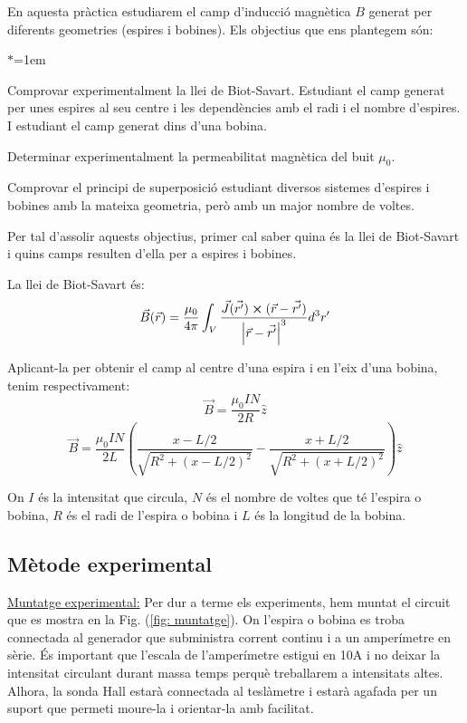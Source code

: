 \documentclass[11pt]{article}
\numberwithin{equation}{section}
\numberwithin{figure}{section}
\numberwithin{table}{section}
\begin{document}
En aquesta pràctica estudiarem el camp d'inducció magnètica $B$ generat per diferents geometries (espires i bobines). Els objectius que ens plantegem són:

\begin{list}{$\ast$}{\leftmargin=1em}
    \item Comprovar experimentalment la llei de Biot-Savart. Estudiant el camp generat per unes espires al seu centre i les dependències amb el radi i el nombre d'espires. I estudiant el camp generat dins d'una bobina.
    \item Determinar experimentalment la permeabilitat magnètica del buit $\mu_0$.
    \item Comprovar el principi de superposició estudiant diversos sistemes d'espires i bobines amb la mateixa geometria, però amb un major nombre de voltes.
\end{list}

Per tal d'assolir aquests objectius, primer cal saber quina és la llei de Biot-Savart i quins camps resulten d'ella per a espires i bobines.

La llei de Biot-Savart és:
\begin{equation} \label{eq: Biot-Savart}
    \vec{B}(\vec{r}) = \frac{\mu_0}{4\pi}\int_V\frac{\vec{J}(\vec{r'}) \cross (\vec{r}-\vec{r'})}{\abs{\vec{r}-\vec{r'}}^3}d^3r'
\end{equation}

Aplicant-la per obtenir el camp al centre d'una espira i en l'eix d'una bobina, tenim respectivament:
\begin{equation} \label{eq: B_espira}
    \vec{B} = \frac{\mu_0IN}{2R}\hat{z}
\end{equation}
\begin{equation} \label{eq: B_bobina}
    \vec{B} = \frac{\mu_0IN}{2L}\left(\frac{x-L/2}{\sqrt{R^2+(x-L/2)^2}}-\frac{x+L/2}{\sqrt{R^2+(x+L/2)^2}}  \right) \hat{z}
\end{equation}

On $I$ és la intensitat que circula, $N$ és el nombre de voltes que té l'espira o bobina, $R$ és el radi de l'espira o bobina i $L$ és la longitud de la bobina.

\subsection{Mètode experimental}\label{sec: mètode}

\underline{Muntatge experimental:}
Per dur a terme els experiments, hem muntat el circuit que es mostra en la Fig. (\ref{fig: muntatge}). On l'espira o bobina es troba connectada al generador que subministra corrent continu i a un amperímetre en sèrie. És important que l'escala de l'amperímetre estigui en 10A i no deixar la intensitat circulant durant massa temps perquè treballarem a intensitats altes. Alhora, la sonda Hall estarà connectada al teslàmetre i estarà agafada per un suport que permeti moure-la i orientar-la amb facilitat.
\end{document}
